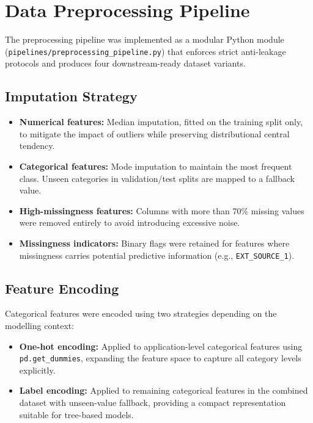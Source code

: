 \section{Data Preprocessing Pipeline}
\label{sec:preprocessing}

The preprocessing pipeline was implemented as a modular Python module (\texttt{pipelines/preprocessing\_pipeline.py}) that enforces strict anti-leakage protocols and produces four downstream-ready dataset variants.

\subsection{Imputation Strategy}

\begin{itemize}
    \item \textbf{Numerical features:} Median imputation, fitted on the training split only, to mitigate the impact of outliers while preserving distributional central tendency.
    \item \textbf{Categorical features:} Mode imputation to maintain the most frequent class. Unseen categories in validation/test splits are mapped to a fallback value.
    \item \textbf{High-missingness features:} Columns with more than 70\% missing values were removed entirely to avoid introducing excessive noise.
    \item \textbf{Missingness indicators:} Binary flags were retained for features where missingness carries potential predictive information (e.g., \texttt{EXT\_SOURCE\_1}).
\end{itemize}

\subsection{Feature Encoding}

Categorical features were encoded using two strategies depending on the modelling context:
\begin{itemize}
    \item \textbf{One-hot encoding:} Applied to application-level categorical features using \texttt{pd.get\_dummies}, expanding the feature space to capture all category levels explicitly.
    \item \textbf{Label encoding:} Applied to remaining categorical features in the combined dataset with unseen-value fallback, providing a compact representation suitable for tree-based models.
\end{itemize}

